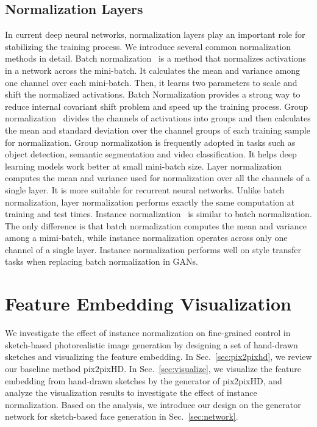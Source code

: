 \documentclass[10pt,twocolumn,letterpaper]{article}
\begin{document}
\subsection{Normalization Layers}
In current deep neural networks, normalization layers play an important role for stabilizing the training process. 
We introduce several common normalization methods in detail. 
Batch normalization~\cite{bn} is a method that normalizes activations in a network across the mini-batch. 
It calculates the mean and variance among one channel over each mini-batch. Then, it learns two parameters to scale and shift the normalized activations.
Batch Normalization provides a strong way to reduce internal covariant shift problem and speed up the training process.
Group normalization~\cite{gn} divides the channels of activations into groups and then calculates the mean and standard deviation over the channel groups of each training sample for normalization.
Group normalization is frequently adopted in tasks such as object detection, semantic segmentation and video classification. It helps deep learning models work better at small mini-batch size.
Layer normalization~\cite{ln} computes the mean and variance used for normalization over all the channels of a single layer. It is more suitable for recurrent neural networks. 
Unlike batch normalization, layer normalization performs exactly the same computation at training and test times.
Instance normalization~\cite{instance_norm} is similar to batch normalization. The only difference is that batch normalization computes the mean and variance among a mimi-batch, while instance normalization operates across only one channel of a single layer. 
Instance normalization performs well on style transfer~\cite{carigan,apdrawinggan,stylization,cartoongan,singlegan,transgaga,harmonic} tasks when replacing batch normalization in GANs.


\section{Feature Embedding Visualization}
We investigate the effect of instance normalization on fine-grained control in sketch-based photorealistic image generation by designing a set of hand-drawn sketches and visualizing the feature embedding.
In Sec.~\ref{sec:pix2pixhd}, we review our baseline method pix2pixHD.
In Sec.~\ref{sec:visualize}, we visualize the feature embedding from hand-drawn sketches by the generator of pix2pixHD, and analyze the visualization results to investigate the effect of instance normalization. 
Based on the analysis, we introduce our design on the generator network for sketch-based face generation in Sec.~\ref{sec:network}.
\end{document}
